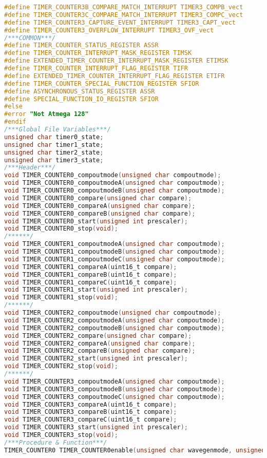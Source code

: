 \begin{lstlisting}[language=C, caption={atmega128timer.c}, label=atmega128timer-c, captionpos=b]
#define TIMER_COUNTER3B_COMPARE_MATCH_INTERRUPT TIMER3_COMPB_vect
#define TIMER_COUNTER3C_COMPARE_MATCH_INTERRUPT TIMER3_COMPC_vect
#define TIMER_COUNTER3_CAPTURE_EVENT_INTERRUPT TIMER3_CAPT_vect
#define TIMER_COUNTER3_OVERFLOW_INTERRUPT TIMER3_OVF_vect
/***COMMON***/
#define TIMER_COUNTER_STATUS_REGISTER ASSR
#define TIMER_COUNTER_INTERRUPT_MASK_REGISTER TIMSK
#define EXTENDED_TIMER_COUNTER_INTERRUPT_MASK_REGISTER ETIMSK
#define TIMER_COUNTER_INTERRUPT_FLAG_REGISTER TIFR
#define EXTENDED_TIMER_COUNTER_INTERRUPT_FLAG_REGISTER ETIFR
#define TIMER_COUNTER_SPECIAL_FUNCTION_REGISTER SFIOR
#define ASYNCHRONOUS_STATUS_REGISTER ASSR
#define SPECIAL_FUNCTION_IO_REGISTER SFIOR
#else
#error "Not Atmega 128"
#endif
/***Global File Variables***/
unsigned char timer0_state;
unsigned char timer1_state;
unsigned char timer2_state;
unsigned char timer3_state;
/***Header***/
void TIMER_COUNTER0_compoutmode(unsigned char compoutmode);
void TIMER_COUNTER0_compoutmodeA(unsigned char compoutmode);
void TIMER_COUNTER0_compoutmodeB(unsigned char compoutmode);
void TIMER_COUNTER0_compare(unsigned char compare);
void TIMER_COUNTER0_compareA(unsigned char compare);
void TIMER_COUNTER0_compareB(unsigned char compare);
void TIMER_COUNTER0_start(unsigned int prescaler);
void TIMER_COUNTER0_stop(void);
/******/
void TIMER_COUNTER1_compoutmodeA(unsigned char compoutmode);
void TIMER_COUNTER1_compoutmodeB(unsigned char compoutmode);
void TIMER_COUNTER1_compoutmodeC(unsigned char compoutmode);
void TIMER_COUNTER1_compareA(uint16_t compare);
void TIMER_COUNTER1_compareB(uint16_t compare);
void TIMER_COUNTER1_compareC(uint16_t compare);
void TIMER_COUNTER1_start(unsigned int prescaler);
void TIMER_COUNTER1_stop(void);
/******/
void TIMER_COUNTER2_compoutmode(unsigned char compoutmode);
void TIMER_COUNTER2_compoutmodeA(unsigned char compoutmode);
void TIMER_COUNTER2_compoutmodeB(unsigned char compoutmode);
void TIMER_COUNTER2_compare(unsigned char compare);
void TIMER_COUNTER2_compareA(unsigned char compare);
void TIMER_COUNTER2_compareB(unsigned char compare);
void TIMER_COUNTER2_start(unsigned int prescaler);
void TIMER_COUNTER2_stop(void);
/******/
void TIMER_COUNTER3_compoutmodeA(unsigned char compoutmode);
void TIMER_COUNTER3_compoutmodeB(unsigned char compoutmode);
void TIMER_COUNTER3_compoutmodeC(unsigned char compoutmode);
void TIMER_COUNTER3_compareA(uint16_t compare);
void TIMER_COUNTER3_compareB(uint16_t compare);
void TIMER_COUNTER3_compareC(uint16_t compare);
void TIMER_COUNTER3_start(unsigned int prescaler);
void TIMER_COUNTER3_stop(void);
/***Procedure & Function***/
TIMER_COUNTER0 TIMER_COUNTER0enable(unsigned char wavegenmode, unsigned char interrupt)

\end{lstlisting}
